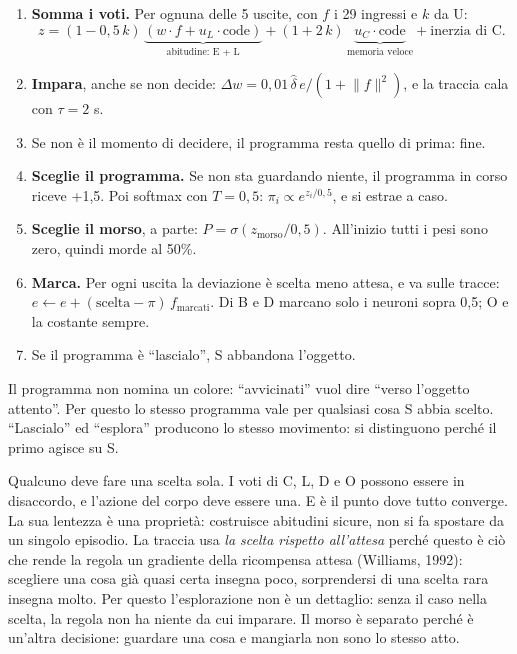 \documentclass[11pt,a4paper]{article}
\newcommand{\voce}[1]{\par\smallskip\noindent{\bfseries\color{acc}#1}\par\nopagebreak}
\begin{document}
\voce{Come funziona, a ogni passo}
\begin{enumerate}
\item \textbf{Somma i voti.} Per ognuna delle 5 uscite, con $f$ i 29 ingressi e $k$ da U:
\[
z=(1-0{,}5\,k)\,\underbrace{(w\cdot f+u_L\cdot\text{code})}_{\text{abitudine: E + L}}
+(1+2\,k)\,\underbrace{u_C\cdot\text{code}}_{\text{memoria veloce}}
+\text{inerzia di C}.
\]
\item \textbf{Impara}, anche se non decide: $\Delta w=0{,}01\,\hat\delta\,e/(1+\lVert f\rVert^2)$, e la traccia cala con $\tau=2$ s.
\item Se non è il momento di decidere, il programma resta quello di prima: fine.
\item \textbf{Sceglie il programma.} Se non sta guardando niente, il programma in corso riceve +1,5. Poi softmax con $T=0{,}5$:
  $\pi_i\propto e^{z_i/0{,}5}$, e si estrae a caso.
\item \textbf{Sceglie il morso}, a parte: $P=\sigma(z_{\text{morso}}/0{,}5)$. All'inizio tutti i pesi sono zero, quindi morde al 50\%.
\item \textbf{Marca.} Per ogni uscita la deviazione è scelta meno attesa, e va sulle tracce:
  $e\leftarrow e+(\text{scelta}-\pi)\,f_{\text{marcati}}$. Di B e D marcano solo i neuroni sopra 0,5; O e la costante sempre.
\item Se il programma è ``lascialo'', S abbandona l'oggetto.
\end{enumerate}
Il programma non nomina un colore: ``avvicinati'' vuol dire ``verso l'oggetto attento''. Per questo
lo stesso programma vale per qualsiasi cosa S abbia scelto. ``Lascialo'' ed ``esplora'' producono lo stesso movimento: si
distinguono perché il primo agisce su S.

\voce{Perché serve}
Qualcuno deve fare una scelta sola. I voti di C, L, D e O possono essere in disaccordo, e
l'azione del corpo deve essere una. E è il punto dove tutto converge. La sua lentezza è
una proprietà: costruisce abitudini sicure, non si fa spostare da un singolo episodio.
La traccia usa \emph{la scelta rispetto all'attesa} perché questo è ciò che rende la
regola un gradiente della ricompensa attesa (Williams, 1992): scegliere una cosa già
quasi certa insegna poco, sorprendersi di una scelta rara insegna molto. Per questo
l'esplorazione non è un dettaglio: senza il caso nella scelta, la regola non ha niente
da cui imparare. Il morso è separato perché è un'altra decisione: guardare una cosa e
mangiarla non sono lo stesso atto.
\end{document}
